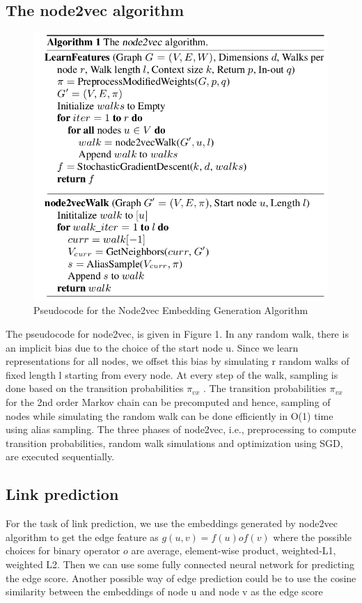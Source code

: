\documentclass[review]{elsarticle}
\begin{document}
\subsection{The node2vec algorithm}
\begin{figure}[h]
    \centering
    \includegraphics[width=1.\textwidth]{Node2vec.png}
    	\caption{Pseudocode for the Node2vec Embedding Generation Algorithm}
	    \label{fig:graphsage_pseudo}
\end{figure}
\noindent The pseudocode for node2vec, is given in Figure 1. In any
random walk, there is an implicit bias due to the choice of the start
node u. Since we learn representations for all nodes, we offset this
bias by simulating r random walks of fixed length l starting from
every node. At every step of the walk, sampling is done based on
the transition probabilities $\pi_{vx}$ . The transition probabilities $\pi_{vx}$ for the 2nd order Markov chain can be precomputed and hence, sampling of nodes while simulating the random walk can be done efficiently in O(1) time using alias sampling. The three phases of node2vec, i.e., preprocessing to compute transition probabilities, random walk simulations and optimization using SGD, are executed sequentially.
\subsection{Link prediction}
\noindent For the task of link prediction, we use the embeddings generated by node2vec algorithm to get the edge feature as $g(u,v) = f(u) o f(v)$ where the possible choices for binary operator $o$ are average, element-wise product, weighted-L1, weighted L2. Then we can use some fully connected neural network for predicting the edge score. Another possible way of edge prediction could be to use the cosine similarity between the embeddings of node u and node v as the edge score
\end{document}

